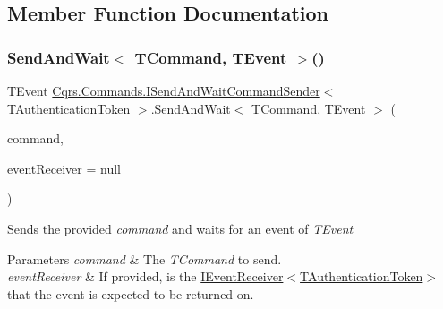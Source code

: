 \subsection{Member Function Documentation}
\mbox{\label{interfaceCqrs_1_1Commands_1_1ISendAndWaitCommandSender_ab64dd5144f0688b0e23ffe289d4ffa2e_ab64dd5144f0688b0e23ffe289d4ffa2e}} 
\subsubsection{\texorpdfstring{Send\+And\+Wait$<$ T\+Command, T\+Event $>$()}{SendAndWait< TCommand, TEvent >()}\hspace{0.1cm}{\footnotesize\ttfamily [1/6]}}
{\footnotesize\ttfamily T\+Event \hyperlink{interfaceCqrs_1_1Commands_1_1ISendAndWaitCommandSender}{Cqrs.\+Commands.\+I\+Send\+And\+Wait\+Command\+Sender}$<$ T\+Authentication\+Token $>$.Send\+And\+Wait$<$ T\+Command, T\+Event $>$ (\begin{DoxyParamCaption}\item[{T\+Command}]{command,  }\item[{\hyperlink{interfaceCqrs_1_1Events_1_1IEventReceiver}{I\+Event\+Receiver}$<$ T\+Authentication\+Token $>$}]{event\+Receiver = {\ttfamily null} }\end{DoxyParamCaption})}



Sends the provided {\itshape command}  and waits for an event of {\itshape T\+Event}  


\begin{DoxyParams}{Parameters}
{\em command} & The {\itshape T\+Command}  to send.\\
\hline
{\em event\+Receiver} & If provided, is the \hyperlink{interfaceCqrs_1_1Events_1_1IEventReceiver}{I\+Event\+Receiver$<$\+T\+Authentication\+Token$>$} that the event is expected to be returned on.\\
\hline
\end{DoxyParams}


